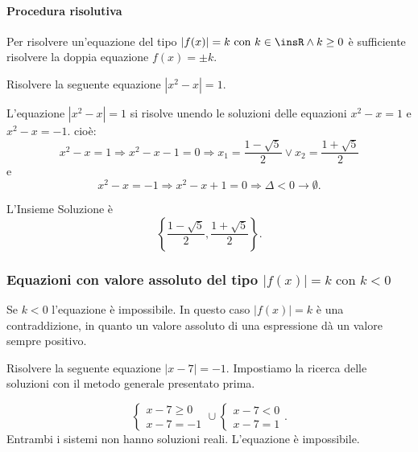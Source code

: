 \paragraph{Procedura risolutiva} Per risolvere un'equazione del tipo $\left|f(x)\right|=k\text{ con }k\in \insR\wedge k\ge 0$ è sufficiente risolvere la doppia equazione $f(x)=\pm k$.
\begin{exrig}
\begin{esempio}
Risolvere la seguente equazione $\left|x^2-x\right|=1$.

L'equazione $\left|x^2-x\right|=1$ si risolve unendo le soluzioni delle equazioni $x^2-x=1$ e $x^2-x=-1$. cioè:
\[x^2-x=1\Rightarrow x^2-x-1=0\Rightarrow x_1=\frac{1-\sqrt 5} 2\vee x_2=\frac{1+\sqrt 5} 2\]
e
\[x^2-x=-1\Rightarrow x^2-x+1=0\Rightarrow \Delta <0\to \emptyset .\]

L'Insieme Soluzione è \[\left\{\frac{1-\sqrt 5} 2,\frac{1+\sqrt 5} 2\right\}.\]
\end{esempio}
\end{exrig}

\subsubsection*{Equazioni con valore assoluto del tipo ${\left|f(x)\right|=k\text{ con }k<0}$}

Se $k<0$ l'equazione è impossibile. In questo caso $\left|f(x)\right|=k$ è una contraddizione, in quanto un valore assoluto di una espressione dà un valore sempre positivo.

\begin{exrig}
\begin{esempio}
Risolvere la seguente equazione $\left|x-7\right|=-1$.
Impostiamo la ricerca delle soluzioni con il metodo generale presentato prima.

\[\left\{\begin{array}{l}{x-7\ge 0}\\{x-7=-1}\end{array}\right. \cup \left\{\begin{array}{l}{x-7<0}\\{x-7=1}\end{array}\right..\]
Entrambi i sistemi non hanno soluzioni reali. L'equazione è impossibile.
\end{esempio}
\end{exrig}

